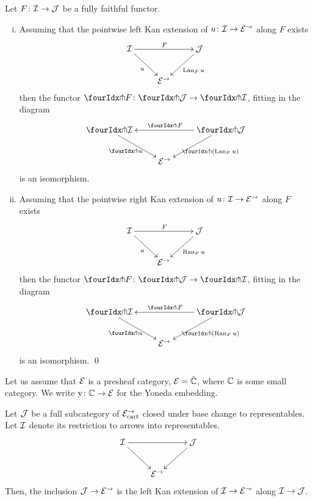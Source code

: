 \documentclass[reqno,10pt,a4paper,oneside,draft]{amsart}
\begin{document}
\begin{proposition} \label{kan-extension-closure}
Let $F \co \cal{I} \to \cal{J}$ be a fully faithful functor.
\begin{enumerate}[(i)]
\item Assuming that the pointwise left Kan extension of $u \co \cal{I} \to \catE^\to$ along $F$ exists
\[
\xymatrix{
  \cal{I}
  \ar[dr]_{u}
  \ar[rr]^{F}
&&
  \cal{J}
  \ar[dl]^{\Lan_F u}
\\&
  \catE^\to
}
\]
then the functor $\liftr{F} \co \liftr{\cal{J}} \to \liftr{\cal{I}}$, fitting in the diagram
\[
\xymatrix{
  \liftr{\cal{I}}
  \ar[dr]_{\liftr{u}}
&&
  \liftr{\cal{J}}
  \ar[ll]_{\liftr{F}}
  \ar[dl]^{\liftr{(\Lan_F u)}}
\\&
  \catE^\to
}
\]
is an isomorphism.
\item Assuming that the pointwise right Kan extension of $u \co \cal{I} \to \catE^\to$ along $F$ exists
\[
\xymatrix{
  \cal{I}
  \ar[dr]_{u}
  \ar[rr]^{F}
&&
  \cal{J}
  \ar[dl]^{\Ran_F u}
\\&
  \catE^\to
}
\]
then the functor $\liftl{F} \co \liftl{\cal{J}} \to \liftl{\cal{I}}$, fitting in the diagram
\[
\xymatrix{
  \liftl{\cal{I}}
  \ar[dr]_{\liftl{u}}
&&
  \liftl{\cal{J}}
  \ar[ll]_{\liftl{F}}
  \ar[dl]^{\liftl{(\Ran_F u)}}
\\&
  \catE^\to
}
\]
is an isomorphism.
\qed
\end{enumerate}
\end{proposition}

\medskip

\newcommand{\yon}{\mathrm{y}}

Let us assume that $\catE$ is a presheaf category, \ie $\catE = \hat{\cat{C}}$, where $\catC$ is some small category.
We write $\yon \co \cat{C} \to \catE$ for the Yoneda embedding.

\begin{proposition} \label{left-kan-extension-of-representables}
Let $\cal{J}$ be a full subcategory of $\catE_{\cart}^\to$ closed under base change to representables.
Let $\cal{I}$ denote its restriction to arrows into representables.
\[
\xymatrix{
  \cal{I}
  \ar[rr]
  \ar[dr]
&&
  \cal{J}
  \ar[dl]
\\&
  \catE^\to
}
\]
Then, the inclusion $\cal{J} \to \catE^\to$ is the left Kan extension of $\cal{I} \to \catE^\to$ along $\cal{I} \to \cal{J}$.
\end{proposition}
\end{document}
